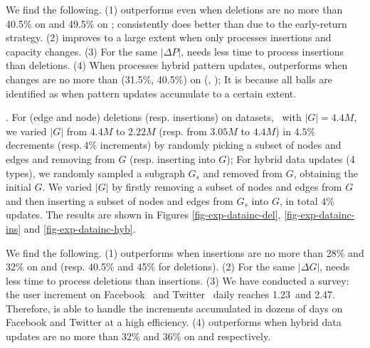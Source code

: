We find the following.
(1) \inc outperforms \optgrouprec even when deletions are no more than 40.5\% on \citationd and 49.5\% on \synthetic;
\inc consistently does better than \optgrouprec due to the early-return strategy.
(2) \inc improves \optgrouprec to a large extent when only processes insertions and capacity changes.
(3) For the same $|\Delta P|$, \inc needs less time to process insertions than deletions.
(4) When processes hybrid pattern updates, \inc outperforms \optgrouprec when changes are no more than (31.5\%, 40.5\%) on (\citationd, \synthetic);
It is because all balls are identified as \affballsx when pattern updates accumulate to a certain extent.

. For (edge and node) deletions (resp. insertions) on datasets,
\eg\ \citationd with $|G|=4.4M$,
we varied $|G|$ from $4.4M$ to $2.22M$ (resp. from $3.05M$ to $4.4M$) in $4.5\%$ decrements (resp.\,$4\%$ increments) by randomly picking a subset of nodes and edges and removing from $G$ (resp. inserting into $G$);
For hybrid data updates (4 types), we randomly sampled a subgraph $G_s$ and removed from $G$, obtaining the initial $G$. %
We varied $|G|$ by firstly removing a subset of nodes and edges from $G$ and then inserting a subset of nodes and edges from $G_s$ into $G$, in total  $4\%$ updates.
The results are shown in Figures \ref{fig-exp-datainc-del}, \ref{fig-exp-datainc-ins} and \ref{fig-exp-datainc-hyb}.

We find the following.
(1) \inc outperforms \optgrouprec when insertions are no more than 28\% and 32\% on \citationd and \synthetic (resp. 40.5\% and 45\% for deletions).
(2) For the same $|\Delta G|$, \inc needs less time to process deletions than insertions.
(3) We have conducted a survey: the user increment on Facebook~\cite{facebookStat} and Twitter~\cite{twitterStat} daily reaches 1.23\textperthousand\ and 2.47\textperthousand.
Therefore, \inc is able to handle the increments accumulated in dozens of days on Facebook and Twitter
at a high efficiency.
(4) \inc outperforms \optgrouprec when hybrid data updates are no more than 32\% and 36\% on \citationd and \synthetic respectively.



